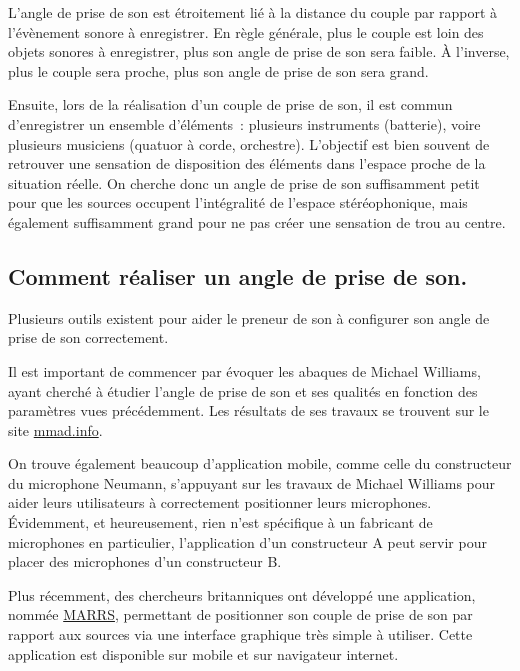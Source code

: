 \documentclass[
]{book}
\begin{document}
L'angle de prise de son est étroitement lié à la distance du couple par rapport à l'évènement sonore à enregistrer. En règle générale, plus le couple est loin des objets sonores à enregistrer, plus son angle de prise de son sera faible. À l'inverse, plus le couple sera proche, plus son angle de prise de son sera grand.

Ensuite, lors de la réalisation d'un couple de prise de son, il est commun d'enregistrer un ensemble d'éléments~: plusieurs instruments (batterie), voire plusieurs musiciens (quatuor à corde, orchestre). L'objectif est bien souvent de retrouver une sensation de disposition des éléments dans l'espace proche de la situation réelle. On cherche donc un angle de prise de son suffisamment petit pour que les sources occupent l'intégralité de l'espace stéréophonique, mais également suffisamment grand pour ne pas créer une sensation de trou au centre.

\hypertarget{comment-ruxe9aliser-un-angle-de-prise-de-son.}{%
\subsection{Comment réaliser un angle de prise de son.}\label{comment-ruxe9aliser-un-angle-de-prise-de-son.}}

Plusieurs outils existent pour aider le preneur de son à configurer son angle de prise de son correctement.

Il est important de commencer par évoquer les abaques de Michael Williams, ayant cherché à étudier l'angle de prise de son et ses qualités en fonction des paramètres vues précédemment. Les résultats de ses travaux se trouvent sur le site \href{https://www.mmad.info/MAD/2\%20Ch/2ch.htm}{mmad.info}.

On trouve également beaucoup d'application mobile, comme celle du constructeur du microphone Neumann, s'appuyant sur les travaux de Michael Williams pour aider leurs utilisateurs à correctement positionner leurs microphones. Évidemment, et heureusement, rien n'est spécifique à un fabricant de microphones en particulier, l'application d'un constructeur A peut servir pour placer des microphones d'un constructeur B.

Plus récemment, des chercheurs britanniques ont développé une application, nommée \href{https://marrsweb.hud.ac.uk/}{MARRS}, permettant de positionner son couple de prise de son par rapport aux sources via une interface graphique très simple à utiliser. Cette application est disponible sur mobile et sur navigateur internet.
\end{document}
